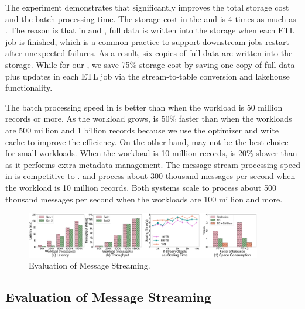 The experiment demonstrates that \sys significantly improves the total storage cost and the batch processing time. The storage cost in the \hdfs and \kafka  is 4 times as much as \sys. The reason is that in \hdfs and \kafka, full data is written into the storage when each ETL job is finished, which is a common practice to support downstream jobs restart after unexpected failures. As a result, six copies of full data are written into the storage. 
While for our \sys, we save 75\%  storage cost by saving one copy of full data plus updates in each ETL job via the stream-to-table conversion and lakehouse functionality.

The batch processing speed in \sys is better than \hdfs when the workload is 50 million records or more.  As the workload grows,  \sys is 50\% faster than \hdfs when the workloads are 500 million and 1 billion records because we use the \brain optimizer and  write cache to improve the efficiency.
 On the other hand, \sys may not be the best choice for small workloads. When the workload is 10 million records, \sys is 20\% slower than \hdfs as it performs extra metadata management.
The message stream processing speed in \sys is competitive to \kafka. \sys and \kafka process about 300 thousand messages per second when the workload is 10 million records. Both systems scale to process about 500 thousand messages per second when the workloads are 100 million and more. 


\begin{figure}
	\centering
	\includegraphics[width=0.92\textwidth]{figures/streamengine}
	\vspace{-1em}
	\caption{Evaluation of Message Streaming.}
	\label{fig:streamengine}
	\vspace{-2em}
\end{figure}



\subsection{Evaluation of Message Streaming}

